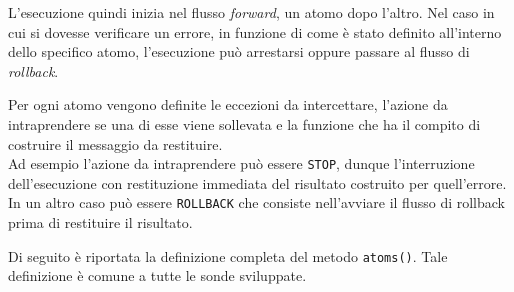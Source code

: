 \documentclass[a4paper,11pt]{report}
\begin{document}
L'esecuzione quindi inizia nel flusso \textit{forward}, un atomo dopo l'altro. Nel caso in cui si dovesse verificare un errore, in funzione di come è stato definito all'interno dello specifico atomo, l'esecuzione può arrestarsi oppure passare al flusso di \textit{rollback}.

Per ogni atomo vengono definite le eccezioni da intercettare, l'azione da intraprendere se una di esse viene sollevata e la funzione che ha il compito di costruire il messaggio da restituire.\\
Ad esempio l'azione da intraprendere può essere \texttt{STOP}, dunque l'interruzione dell'esecuzione con restituzione immediata del risultato costruito per quell'errore. In un altro caso può essere \texttt{ROLLBACK} che consiste nell'avviare il flusso di rollback prima di restituire il risultato.

Di seguito è riportata la definizione completa del metodo \texttt{atoms()}. Tale definizione è comune a tutte le sonde sviluppate.
\end{document}
